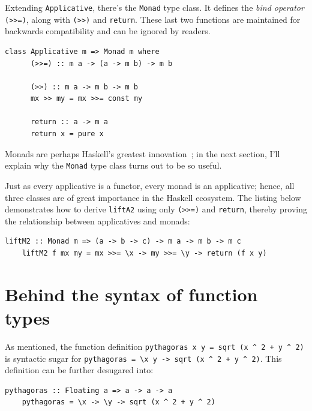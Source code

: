 \documentclass[UdineBachThesis,american,11pt]{PhdThesis}
\begin{document}
  Extending \mbox{\texttt{Applicative}}, there's the \mbox{\texttt{Monad}} type
  class. It defines the \emph{bind operator} \mbox{\texttt{(>>=)}}, along with
  \mbox{\texttt{(>>)}} and \mbox{\texttt{return}}. These last two functions are
  maintained for backwards compatibility and can be ignored by readers.

  \begin{Verbatim}[gobble=4,fontsize=\small]
    class Applicative m => Monad m where
      (>>=) :: m a -> (a -> m b) -> m b

      (>>) :: m a -> m b -> m b
      mx >> my = mx >>= const my

      return :: a -> m a
      return x = pure x
  \end{Verbatim}

  Monads are perhaps Haskell's greatest
  innovation~\cite{monads-for-functional-programming}; in the next section, I'll
  explain why the \mbox{\texttt{Monad}} type class turns out to be so useful.

  Just as every applicative is a functor, every monad is an applicative; hence,
  all three classes are of great importance in the Haskell ecosystem. The
  listing below demonstrates how to derive \mbox{\texttt{liftA2}} using only
  \mbox{\texttt{(>>=)}} and \mbox{\texttt{return}}, thereby proving the
  relationship between applicatives and monads:

  \begin{Verbatim}[gobble=4,fontsize=\small]
    liftM2 :: Monad m => (a -> b -> c) -> m a -> m b -> m c
    liftM2 f mx my = mx >>= \x -> my >>= \y -> return (f x y)
  \end{Verbatim}

  \newpage

  \section{Behind the syntax of function types}

  As mentioned, the function definition
  \mbox{\texttt{pythagoras x y = sqrt (x {\textasciicircum} 2 + y {\textasciicircum} 2)}}
  is syntactic sugar for
  \mbox{\texttt{pythagoras = \textbackslash x y -> sqrt (x {\textasciicircum} 2 + y {\textasciicircum} 2)}}.
  This definition can be further desugared into:

  \begin{Verbatim}[gobble=4,fontsize=\small]
    pythagoras :: Floating a => a -> a -> a
    pythagoras = \x -> \y -> sqrt (x ^ 2 + y ^ 2)
  \end{Verbatim}
\end{document}
